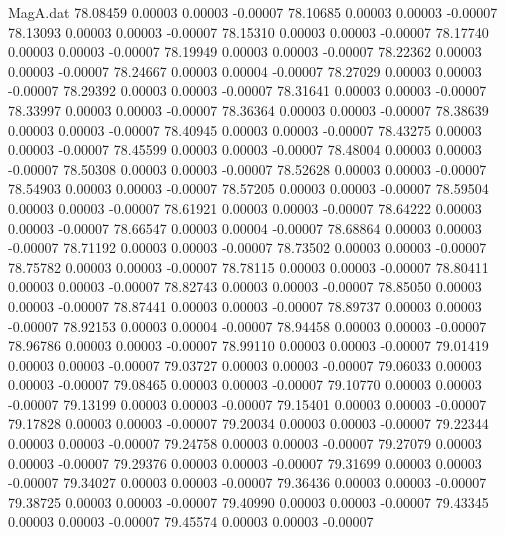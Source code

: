 \begin{filecontents}{MagA.dat}
  78.08459    0.00003    0.00003   -0.00007
  78.10685    0.00003    0.00003   -0.00007
  78.13093    0.00003    0.00003   -0.00007
  78.15310    0.00003    0.00003   -0.00007
  78.17740    0.00003    0.00003   -0.00007
  78.19949    0.00003    0.00003   -0.00007
  78.22362    0.00003    0.00003   -0.00007
  78.24667    0.00003    0.00004   -0.00007
  78.27029    0.00003    0.00003   -0.00007
  78.29392    0.00003    0.00003   -0.00007
  78.31641    0.00003    0.00003   -0.00007
  78.33997    0.00003    0.00003   -0.00007
  78.36364    0.00003    0.00003   -0.00007
  78.38639    0.00003    0.00003   -0.00007
  78.40945    0.00003    0.00003   -0.00007
  78.43275    0.00003    0.00003   -0.00007
  78.45599    0.00003    0.00003   -0.00007
  78.48004    0.00003    0.00003   -0.00007
  78.50308    0.00003    0.00003   -0.00007
  78.52628    0.00003    0.00003   -0.00007
  78.54903    0.00003    0.00003   -0.00007
  78.57205    0.00003    0.00003   -0.00007
  78.59504    0.00003    0.00003   -0.00007
  78.61921    0.00003    0.00003   -0.00007
  78.64222    0.00003    0.00003   -0.00007
  78.66547    0.00003    0.00004   -0.00007
  78.68864    0.00003    0.00003   -0.00007
  78.71192    0.00003    0.00003   -0.00007
  78.73502    0.00003    0.00003   -0.00007
  78.75782    0.00003    0.00003   -0.00007
  78.78115    0.00003    0.00003   -0.00007
  78.80411    0.00003    0.00003   -0.00007
  78.82743    0.00003    0.00003   -0.00007
  78.85050    0.00003    0.00003   -0.00007
  78.87441    0.00003    0.00003   -0.00007
  78.89737    0.00003    0.00003   -0.00007
  78.92153    0.00003    0.00004   -0.00007
  78.94458    0.00003    0.00003   -0.00007
  78.96786    0.00003    0.00003   -0.00007
  78.99110    0.00003    0.00003   -0.00007
  79.01419    0.00003    0.00003   -0.00007
  79.03727    0.00003    0.00003   -0.00007
  79.06033    0.00003    0.00003   -0.00007
  79.08465    0.00003    0.00003   -0.00007
  79.10770    0.00003    0.00003   -0.00007
  79.13199    0.00003    0.00003   -0.00007
  79.15401    0.00003    0.00003   -0.00007
  79.17828    0.00003    0.00003   -0.00007
  79.20034    0.00003    0.00003   -0.00007
  79.22344    0.00003    0.00003   -0.00007
  79.24758    0.00003    0.00003   -0.00007
  79.27079    0.00003    0.00003   -0.00007
  79.29376    0.00003    0.00003   -0.00007
  79.31699    0.00003    0.00003   -0.00007
  79.34027    0.00003    0.00003   -0.00007
  79.36436    0.00003    0.00003   -0.00007
  79.38725    0.00003    0.00003   -0.00007
  79.40990    0.00003    0.00003   -0.00007
  79.43345    0.00003    0.00003   -0.00007
  79.45574    0.00003    0.00003   -0.00007

\end{filecontents}
